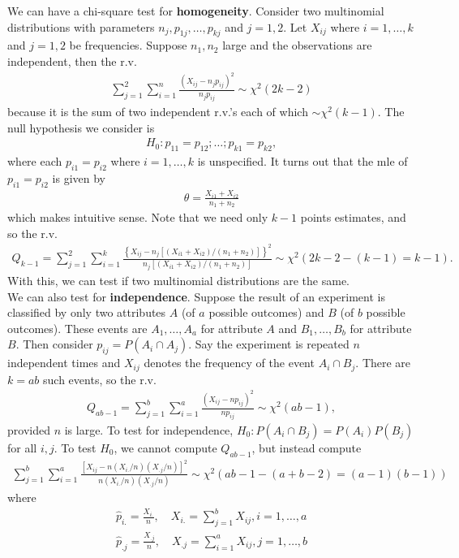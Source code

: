 \documentclass{book}
\theoremstyle{definition}
\newcommand{\f}[2]{\frac{#1}{#2}}
\newcommand{\lc}{\left\{}
\newcommand{\rc}{\right\}}
\begin{document}
We can have a chi-square test for \textbf{homogeneity}. Consider two multinomial distributions with parameters $n_j, p_{1j},\dots,p_{kj}$ and $j=1,2$. Let $X_{ij}$ where $i = 1,\dots,k$ and $j=1,2$ be frequencies. Suppose $n_1,n_2$ large and the observations are independent, then the r.v.
\begin{align}
\sum^2_{j=1}\sum^n_{i=1}\f{(X_{ij} - n_jp_{ij})^2}{n_jp_{ij}} \sim \chi^2(2k-2)
\end{align}
because it is the sum of two independent r.v.'s each of which $\sim \chi^2(k-1)$. The null hypothesis we consider is
\begin{align}
H_0: p_{11} = p_{12}; \dots; p_{k1} = p_{k2},
\end{align}
where each $p_{i1} = p_{i2}$ where $i=1,\dots,k$ is unspecified. It turns out that the mle of $p_{i1} = p_{i2}$ is given by
\begin{align}
\theta = \f{X_{i1}+X_{i2}}{n_1+n_2}
\end{align}
which makes intuitive sense. Note that we need only $k-1$ points estimates, and so the r.v.
\begin{align}
Q_{k-1} = \sum^2_{j=1}\sum^k_{i=1}\f{\lc X_{ij} - n_j[(X_{i1}+X_{i2})/(n_1+n_2)] \rc^2}{n_j[(X_{i1}+X_{i2})/(n_1+n_2)]} \sim \chi^2(2k-2-(k-1) = k-1).
\end{align}
With this, we can test if two multinomial distributions are the same. \\

We can also test for \textbf{independence}. Suppose the result of an experiment is classified by only two attributes $A$ (of $a$ possible outcomes) and $B$ (of $b$ possible outcomes). These events are $A_1,\dots,A_a$ for attribute $A$ and $B_1,\dots,B_b$ for attribute $B$. Then consider $p_{ij} = P(A_i\cap A_j)$. Say the experiment is repeated $n$ independent times and $X_{ij}$ denotes the frequency of the event $A_i \cap B_j$. There are $k=ab$ such events, so the r.v.
\begin{align}
Q_{ab-1} = \sum^b_{j=1}\sum^a_{i=1}\f{(X_{ij} - np_{ij})^2}{np_{ij}} \sim \chi^2(ab-1),
\end{align}
provided $n$ is large. To test for independence, $H_0: P(A_i\cap B_j) = P(A_i)P(B_j)$ for all $i,j$. To test $H_0$, we cannot compute $Q_{ab-1}$, but instead compute 
\begin{align}
\sum^b_{j=1}\sum^a_{i=1}\f{[X_{ij} -n(X_{i.}/n)(X_{.j}/n)]^2}{n(X_{i.}/n)(X_{.j}/n)} \sim \chi^2(ab-1-(a+b-2) = (a-1)(b-1))
\end{align}
where
\begin{align}
\hat{p}_{i.} = \f{X_{i.}}{n}, \quad X_{i.} = \sum^b_{j=1}X_{ij}, i=1,\dots,a\\
\hat{p}_{.j} = \f{X_{.j}}{n}, \quad X_{.j} = \sum^a_{i=1}X_{ij}, j=1,\dots,b
\end{align}
\end{document}
